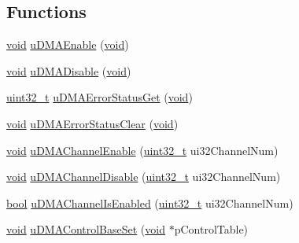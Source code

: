 \subsection*{Functions}
\begin{DoxyCompactItemize}
\item 
\hyperlink{usb__devapi_8h_afabf60e7f57651d6d595a02c75f07cd0}{void} \hyperlink{group__udma__api_ga9c2c43120f113a79cbabf894f5503f41}{u\+D\+M\+A\+Enable} (\hyperlink{usb__devapi_8h_afabf60e7f57651d6d595a02c75f07cd0}{void})
\item 
\hyperlink{usb__devapi_8h_afabf60e7f57651d6d595a02c75f07cd0}{void} \hyperlink{group__udma__api_ga850808381da300573a6101e5a27f4675}{u\+D\+M\+A\+Disable} (\hyperlink{usb__devapi_8h_afabf60e7f57651d6d595a02c75f07cd0}{void})
\item 
\hyperlink{_p_e___types_8h_a33594304e786b158f3fb30289278f5af}{uint32\+\_\+t} \hyperlink{group__udma__api_gad01185c0d570c65da3642e6c60ea4973}{u\+D\+M\+A\+Error\+Status\+Get} (\hyperlink{usb__devapi_8h_afabf60e7f57651d6d595a02c75f07cd0}{void})
\item 
\hyperlink{usb__devapi_8h_afabf60e7f57651d6d595a02c75f07cd0}{void} \hyperlink{group__udma__api_ga875220775201c33cd3c97ebcbca83ac2}{u\+D\+M\+A\+Error\+Status\+Clear} (\hyperlink{usb__devapi_8h_afabf60e7f57651d6d595a02c75f07cd0}{void})
\item 
\hyperlink{usb__devapi_8h_afabf60e7f57651d6d595a02c75f07cd0}{void} \hyperlink{group__udma__api_ga41e21189773539bbc5f302863cd5bf06}{u\+D\+M\+A\+Channel\+Enable} (\hyperlink{_p_e___types_8h_a33594304e786b158f3fb30289278f5af}{uint32\+\_\+t} ui32\+Channel\+Num)
\item 
\hyperlink{usb__devapi_8h_afabf60e7f57651d6d595a02c75f07cd0}{void} \hyperlink{group__udma__api_ga28ded922b57dbc5772036ddcbb8f28d6}{u\+D\+M\+A\+Channel\+Disable} (\hyperlink{_p_e___types_8h_a33594304e786b158f3fb30289278f5af}{uint32\+\_\+t} ui32\+Channel\+Num)
\item 
\hyperlink{_p_e___types_8h_a97a80ca1602ebf2303258971a2c938e2}{bool} \hyperlink{group__udma__api_ga71a15b561a538ff126aabac85ee311b2}{u\+D\+M\+A\+Channel\+Is\+Enabled} (\hyperlink{_p_e___types_8h_a33594304e786b158f3fb30289278f5af}{uint32\+\_\+t} ui32\+Channel\+Num)
\item 
\hyperlink{usb__devapi_8h_afabf60e7f57651d6d595a02c75f07cd0}{void} \hyperlink{group__udma__api_ga9c94fd8f9422abb5231dacb6d51934bb}{u\+D\+M\+A\+Control\+Base\+Set} (\hyperlink{usb__devapi_8h_afabf60e7f57651d6d595a02c75f07cd0}{void} $\ast$p\+Control\+Table)
\item 

\end{DoxyCompactItemize}
